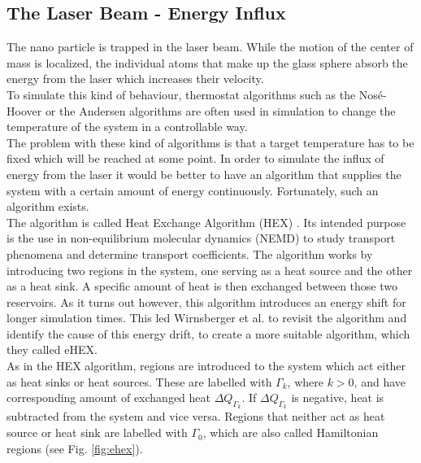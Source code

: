 \documentclass[12pt]{article}
\begin{document}
\subsection{The Laser Beam - Energy Influx}
The nano particle is trapped in the laser beam. While the motion of the center of mass is localized, the
individual atoms that make up the glass sphere absorb the energy from the laser which increases their velocity.\\
To simulate this kind of behaviour, thermostat algorithms \cite{Huenenberger2005} such as the Nos\'e-Hoover \cite{Nose1984,Hoover1985} or the Andersen
\cite{Andersen1980} algorithms are often used in simulation to change the temperature of the system in a controllable way.\\
The problem with these kind of algorithms is that a target temperature has to be fixed which will be reached at some point. In order to simulate the
influx of energy from the laser it would be better to have an algorithm that supplies the system with a certain amount of energy continuously.
Fortunately, such an algorithm exists.\\
The algorithm is called Heat Exchange Algorithm (HEX) \cite{Hafskjold1993}. Its intended purpose is the use in non-equilibrium molecular dynamics
(NEMD) to study transport phenomena and determine transport coefficients. The algorithm works by introducing two regions in the system, one serving as
a heat source and the other as a heat sink. A specific amount of heat is then exchanged between those two reservoirs. As it turns out however, this
algorithm introduces an energy shift for longer simulation times. This led Wirnsberger et al. \cite{Wirnsberger2015} to revisit the algorithm and 
identify the cause of this energy drift, to create a more suitable algorithm, which they called eHEX.\\
As in the HEX algorithm, regions are introduced to the system which act either as heat sinks or heat sources. These are labelled with $\Gamma_k$,
where $k > 0$, and have corresponding amount of exchanged heat $\Delta Q_{\Gamma_k}$. If $\Delta Q_{\Gamma_k}$ is negative, heat is subtracted from
the system and vice versa. Regions that neither act as heat source or heat sink are labelled with $\Gamma_0$, which are also called
Hamiltonian regions (see Fig. \ref{fig:ehex}). 
\end{document}
